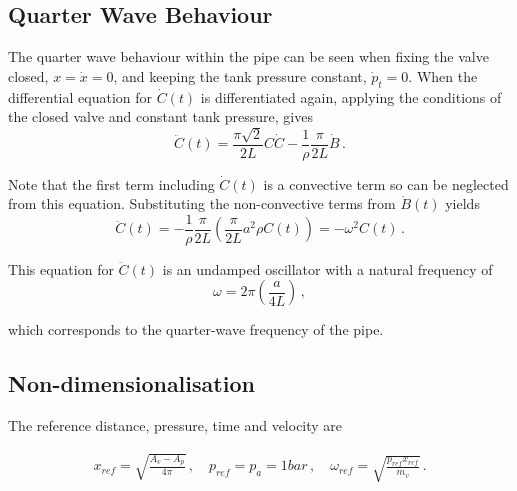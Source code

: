 \subsection{Quarter Wave Behaviour}

The quarter wave behaviour within the pipe can be seen when fixing the valve closed, $x = \dot{x} = 0$, and keeping the tank pressure constant, $\dot{p}_t = 0$. When the differential equation for $\dot{C}(t)$ is differentiated again, applying the conditions of the closed valve and constant tank pressure, gives
~
\begin{equation*}
    \ddot{C}(t) = \frac{\pi \sqrt{2}}{2 L} C \dot{C} - \frac{1}{\rho} \frac{\pi}{2 L} \dot{B} \, .
\end{equation*}

Note that the first term including $\dot{C}(t)$ is a convective term so can be neglected from this equation. Substituting the non-convective terms from $\dot{B}(t)$ yields
~
\begin{equation*}
    \ddot{C}(t) = - \frac{1}{\rho} \frac{\pi}{2 L} \left( \frac{\pi}{2L} a^2 \rho C(t) \right) = - \omega^2 C(t) \, .
\end{equation*}

This equation for $\ddot{C}(t)$ is an undamped oscillator with a natural frequency of
~
\begin{equation*}
    \omega = 2 \pi \left( \frac{a}{4 L} \right) \, ,
\end{equation*}

which corresponds to the quarter-wave frequency of the pipe.




\subsection{Non-dimensionalisation}

The reference distance, pressure, time and velocity are

\begin{equation*}
\begin{split}
    x_{ref} = \sqrt{\frac{A_v - A_p}{4 \pi}}
    \, , \quad
    p_{ref} = p_a = 1 \si{bar}
    \, , \quad
    \omega_{ref} = \sqrt{\frac{p_{ref} x_{ref}}{m_v}} \, .
\end{split}
\end{equation*}

